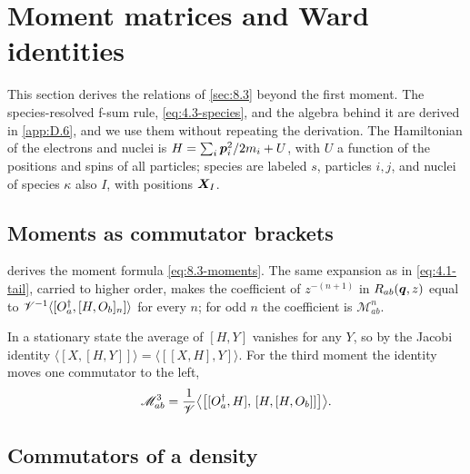 \section{Moment matrices and Ward identities}\label{app:D.26}

This section derives the relations of \cref{sec:8.3} beyond the first moment. The species-resolved f-sum rule, \cref{eq:4.3-species}, and the algebra behind it are derived in \cref{app:D.6}, and we use them without repeating the derivation. The Hamiltonian of the electrons and nuclei is $H = \sum_i\bm{p}_i^2/2m_i + U$, with $U$ a function of the positions and spins of all particles; species are labeled $s$, particles $i, j$, and nuclei of species $\kappa$ also $I$, with positions $\bm{X}_I$.

\subsection{Moments as commutator brackets}

 derives the moment formula \cref{eq:8.3-moments}. The same expansion as in \cref{eq:4.1-tail}, carried to higher order, makes the coefficient of $z^{-(n+1)}$ in $R_{ab}(\bm{q},z)$ equal to $\mathscr{V}^{-1}\langle[O_a^\dagger, [H, O_b]_n]\rangle$ for every $n$; for odd $n$ the coefficient is $\mathscr{M}^n_{ab}$.

In a stationary state the average of $[H, Y]$ vanishes for any $Y$, so by the Jacobi identity $\langle[X, [H, Y]]\rangle = \langle[[X, H], Y]\rangle$. For the third moment the identity moves one commutator to the left,
\begin{equation}
  \mathscr{M}^3_{ab} = \frac1{\mathscr{V}}\bigl\langle\bigl[[O_a^\dagger, H],\,[H, [H, O_b]]\bigr]\bigr\rangle .
  \label{eq:D.26-M3sym}
\end{equation}

\subsection{Commutators of a density}

